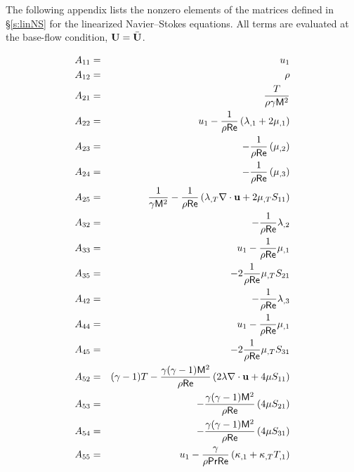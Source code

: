 The following appendix lists the nonzero elements of the matrices defined in
\S\ref{s:linNS} for the linearized Navier--Stokes equations.  All terms
are evaluated at the base-flow condition, ${\bf U} = \bar{{\bf U}}$.

\bigskip
{}
%
\begin{eqnarray} 
  A_{11} &=&  u_1 \\
  A_{12} &=& \rho \\
%
  A_{21} &=& \frac{ T}{ \rho \gamma \M^2} \\
  A_{22} &=&  u_1 -\fact\left(\lambda_{,1} + 
              2 \mu_{,1}\right) \\
  A_{23} &=& -\fact\left(\mu_{,2}\right) \\
  A_{24} &=& -\fact\left(\mu_{,3}\right) \\
  A_{25} &=& \frac{1}{\gamma \M^2} - 
             \fact\left(\dlm \divu + 2 \dmu  S_{11} \right ) \\
%
  A_{32} &=& -\fact\lambda_{,2} \\
  A_{33} &=&  u_1 - \fact\mu_{,1} \\
  A_{35} &=& -2\fact\dmu S_{21} \\
%
  A_{42} &=& -\fact\lambda_{,3} \\
  A_{44} &=&  u_1 -\fact\mu_{,1} \\
  A_{45} &=& -2\fact\dmu S_{31} \\
%
  A_{52} &=& \gammam T - \ff\left(2\lambda\divu + 
                                  4\mu S_{11}\right) \\
  A_{53} &=& -\ff\left(4\mu S_{21}\right) \\
  A_{54} &=& -\ff\left(4\mu S_{31}\right) \\
  A_{55} &=&  u_1 - 
             \frac{\gamma}{\rho\Pr\Re}\left( \kappa_{,1} + 
             \dcon  T_{,1} \right)
\end{eqnarray}
\bigskip
{}
%
